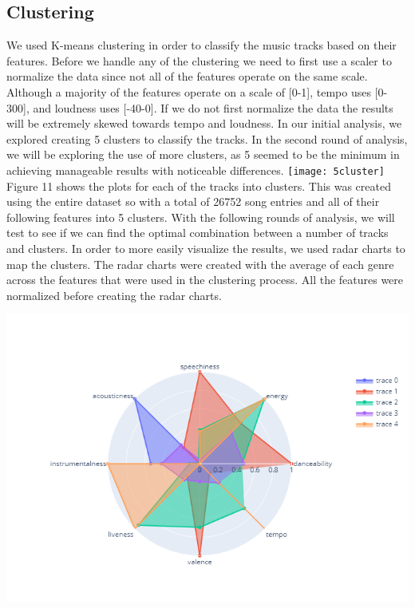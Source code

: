 \documentclass[11pt, a4paper, twocolumn]{article}
\begin{document}
\subsection{Clustering}
We used K-means clustering in order to classify the music tracks based on their features. Before we handle any of the clustering we need to first use a scaler to normalize the data since not all of the features operate on the same scale. Although a majority of the features operate on a scale of [0-1], tempo uses [0-300], and loudness uses [-40-0]. If we do not first normalize the data the results will be extremely skewed towards tempo and loudness. In our initial analysis, we explored creating 5 clusters to classify the tracks. In the second round of analysis, we will be exploring the use of more clusters, as 5 seemed to be the minimum in achieving manageable results with noticeable differences. 
\texttt{[image: 5cluster]}
Figure 11 shows the plots for each of the tracks into clusters. This was created using the entire dataset so with a total of 26752 song entries and all of their following features into 5 clusters. With the following rounds of analysis, we will test to see if we can find the optimal combination between a number of tracks and clusters. 
In order to more easily visualize the results, we used radar charts to map the clusters. The radar charts were created with the average of each genre across the features that were used in the clustering process. All the features were normalized before creating the radar charts.
\centerline{\includegraphics[scale=0.35]{radar}}
\end{document}
